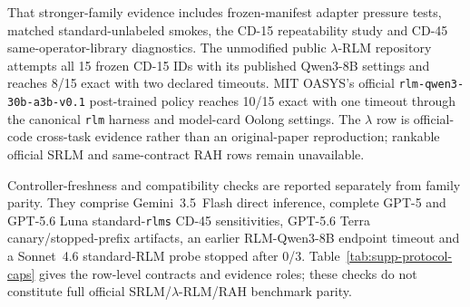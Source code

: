 \documentclass[letterpaper]{article}
\begin{document}
That stronger-family evidence includes frozen-manifest adapter pressure tests, matched standard-unlabeled smokes, the CD-15 repeatability study and CD-45 same-operator-library diagnostics. The unmodified public $\lambda$-RLM repository attempts all 15 frozen CD-15 IDs with its published Qwen3-8B settings and reaches 8/15 exact with two declared timeouts. MIT OASYS's official \texttt{rlm-qwen3-30b-a3b-v0.1} post-trained policy reaches 10/15 exact with one timeout through the canonical \texttt{rlm} harness and model-card Oolong settings. The $\lambda$ row is official-code cross-task evidence rather than an original-paper reproduction; rankable official SRLM and same-contract RAH rows remain unavailable.

Controller-freshness and compatibility checks are reported separately from family parity. They comprise Gemini~3.5~Flash direct inference, complete GPT-5 and GPT-5.6 Luna standard-\texttt{rlms} CD-45 sensitivities, GPT-5.6 Terra canary/stopped-prefix artifacts, an earlier RLM-Qwen3-8B endpoint timeout and a Sonnet~4.6 standard-RLM probe stopped after 0/3. Table~\ref{tab:supp-protocol-caps} gives the row-level contracts and evidence roles; these checks do not constitute full official SRLM/$\lambda$-RLM/RAH benchmark parity.
\end{document}
